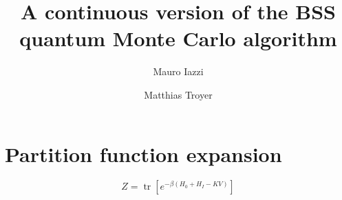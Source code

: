 \documentclass[onecolumn,english,prl,showpacs]{revtex4}
\newcommand{\tr}{\mathop{\text{tr}}\nolimits}
\begin{document}
\title{A continuous version of the BSS quantum Monte Carlo algorithm}

\author{Mauro Iazzi}
\author{Matthias Troyer}


\begin{abstract}
\end{abstract}

\section{Partition function expansion}

\begin{equation}
 Z = \tr\left[ e^{-\beta (H_0+H_I-KV)} \right]
\end{equation}
\end{document}
